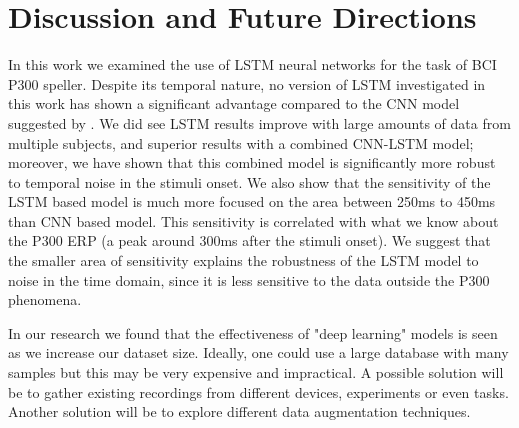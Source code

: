 \documentclass[
12pt, %
english, %
doublespacing, %
headsepline, %
]{MastersDoctoralThesis} %
\begin{document}
\chapter{Discussion and Future Directions}
In this work we examined the use of LSTM neural networks for the task of BCI P300 speller. Despite its temporal nature, no version of LSTM investigated in this work has shown a significant advantage compared to the CNN model suggested by \cite{P300_CNN}. We did see LSTM results improve with large amounts of data from multiple subjects, and superior results with a combined CNN-LSTM model; moreover, we have shown that this combined model is significantly more robust to temporal noise in the stimuli onset. We also show that the sensitivity of the LSTM based model is much more focused on the area between 250ms to 450ms than CNN based model. This sensitivity is correlated with what we know about the P300 ERP (a peak around 300ms after the stimuli onset). We suggest that the smaller area of sensitivity explains the robustness of the LSTM model to noise in the time domain, since it is less sensitive to the data outside the P300 phenomena. 

In our research we found that the effectiveness of "deep learning" models is seen as we increase our dataset size. Ideally, one could use a large database with many samples but this may be very expensive and impractical. A possible solution will be to gather existing recordings from different devices, experiments or even tasks. Another solution will be to explore different data augmentation techniques. 


\renewcommand{\bibsection}{\chapter{References}}





\end{document}
